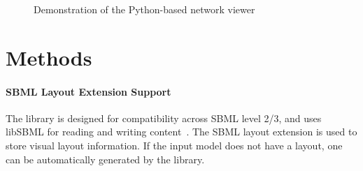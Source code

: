 \documentclass{bioinfo}
\begin{document}
\begin{figure}[!t]%
%


\caption{Demonstration of the Python-based network viewer}

\label{fig:01}
\end{figure}

\section{Methods}

\paragraph{SBML Layout Extension Support} 
The library is designed for compatibility across SBML level 2/3, and uses libSBML for reading and writing content~\citep{BornsteinLibSBML2008}. The SBML layout extension is used to store visual layout information. If the input model does not have a layout, one can be automatically generated by the library.
\end{document}

